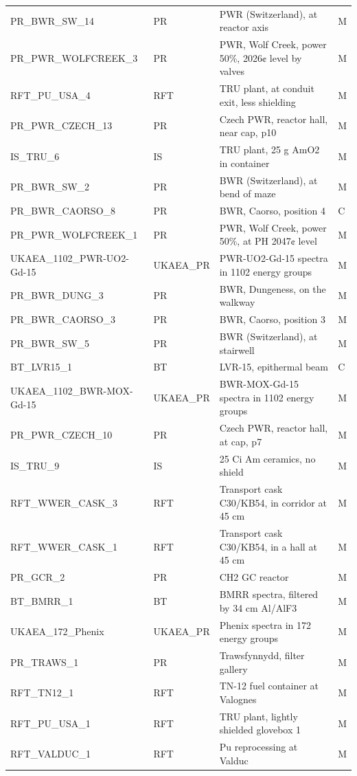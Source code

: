 \documentclass[a4paper, 12pt]{article}
\begin{document}
\begin{appendices}
\begin{longtable}{llll}
PR\_BWR\_SW\_14 & PR & PWR (Switzerland), at reactor axis  & M\\
PR\_PWR\_WOLFCREEK\_3 & PR & PWR, Wolf Creek, power 50\%, 2026¢ level by valves  & M\\
RFT\_PU\_USA\_4 & RFT & TRU plant, at conduit exit, less shielding  & M\\
PR\_PWR\_CZECH\_13 & PR & Czech PWR, reactor hall, near cap, p10  & M\\
IS\_TRU\_6 & IS & TRU plant, 25 g AmO2 in container  & M\\
PR\_BWR\_SW\_2 & PR & BWR (Switzerland), at bend of maze  & M\\
PR\_BWR\_CAORSO\_8 & PR & BWR, Caorso, position 4  & C\\
PR\_PWR\_WOLFCREEK\_1 & PR & PWR, Wolf Creek, power 50\%, at PH 2047¢ level  & M\\
UKAEA\_1102\_PWR-UO2-Gd-15 & UKAEA\_PR & PWR-UO2-Gd-15 spectra in 1102 energy groups & M\\
PR\_BWR\_DUNG\_3 & PR & BWR, Dungeness, on the walkway  & M\\
PR\_BWR\_CAORSO\_3 & PR & BWR, Caorso, position 3  & M\\
PR\_BWR\_SW\_5 & PR & BWR (Switzerland), at stairwell  & M\\
BT\_LVR15\_1 & BT & LVR-15, epithermal beam  & C\\
UKAEA\_1102\_BWR-MOX-Gd-15 & UKAEA\_PR & BWR-MOX-Gd-15 spectra in 1102 energy groups & M\\
PR\_PWR\_CZECH\_10 & PR & Czech PWR, reactor hall, at cap, p7  & M\\
IS\_TRU\_9 & IS & 25 Ci Am ceramics, no shield  & M\\
RFT\_WWER\_CASK\_3 & RFT & Transport cask C30/KB54, in corridor at 45 cm  & M\\
RFT\_WWER\_CASK\_1 & RFT & Transport cask C30/KB54, in a hall at 45 cm  & M\\
PR\_GCR\_2 & PR & CH2 GC reactor  & M\\
BT\_BMRR\_1 & BT & BMRR spectra, filtered by 34 cm Al/AlF3  & M\\
UKAEA\_172\_Phenix & UKAEA\_PR & Phenix spectra in 172 energy groups & M\\
PR\_TRAWS\_1 & PR & Trawsfynnydd, filter gallery  & M\\
RFT\_TN12\_1 & RFT & TN-12 fuel container at Valognes  & M\\
RFT\_PU\_USA\_1 & RFT & TRU plant, lightly shielded glovebox 1  & M\\
RFT\_VALDUC\_1 & RFT & Pu reprocessing at Valduc  & M\\

\end{longtable}
\end{appendices}
\end{document}
